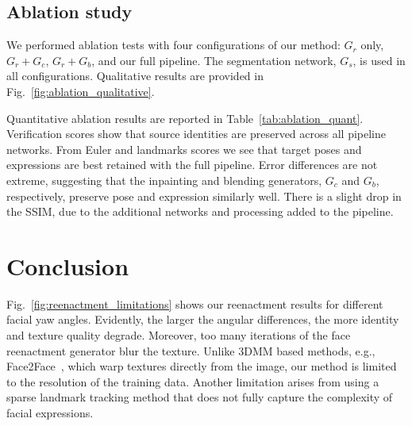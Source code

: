 \subsection{Ablation study}

We performed ablation tests with four configurations of our method: $G_r$ only, $G_r+G_c$, $G_r+G_b$, and our full pipeline. The segmentation network, $G_s$, is used in all configurations. Qualitative results are provided in Fig.~\ref{fig:ablation_qualitative}.

Quantitative ablation results are reported in Table~\ref{tab:ablation_quant}. Verification scores show that source identities are preserved across all pipeline networks. From Euler and landmarks scores we see that target poses and expressions are best retained with the full pipeline. Error differences are not extreme, suggesting that the inpainting and blending generators, $G_{c}$ and $G_{b}$, respectively, preserve pose and expression similarly well. There is a slight drop in the SSIM, due to the additional networks and processing added to the pipeline.

\begin{table}[tbh]
\caption{{\em Quantitative ablation results.} On
FaceForensics++ videos~\cite{roessler2019faceforensics++}.}%
\label{tab:ablation_quant}\vspace{-5mm}%
\end{table}

\section{Conclusion}
 Fig.~\ref{fig:reenactment_limitations} shows our reenactment results for different facial yaw angles. Evidently, the larger the angular differences, the more identity and texture quality degrade. Moreover, too many iterations of the face reenactment generator blur the texture. Unlike 3DMM based methods, e.g., Face2Face~\cite{thies2016face2face}, which warp textures directly from the image, our method is limited to the resolution of the training data. Another limitation arises from using a sparse landmark tracking method that does not fully capture the complexity of facial expressions. %

